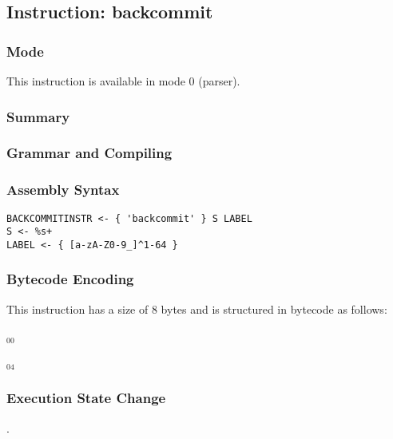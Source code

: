 \subsection{Instruction: backcommit}

\subsubsection{Mode}
This instruction is available in mode 0 (parser).
\subsubsection{Summary}


\subsubsection{Grammar and Compiling}


\subsubsection{Assembly Syntax}

\begin{myquote}
\begin{verbatim}
BACKCOMMITINSTR <- { 'backcommit' } S LABEL
S <- %s+
LABEL <- { [a-zA-Z0-9_]^1-64 }
\end{verbatim}
\end{myquote}

\subsubsection{Bytecode Encoding}

This instruction has a size of 8 bytes and is structured in bytecode as follows:

$_{00}$\ 



$_{04}$\ 


\subsubsection{Execution State Change}

.


